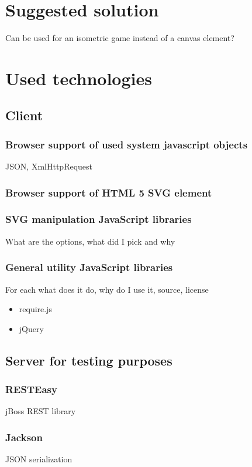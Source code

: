 \documentclass[11pt,oneside, final]{fithesis2}
\begin{document}
\chapter{Suggested solution}
Can be used for an isometric game instead of a canvas element?

\chapter{Used technologies}
\section{Client}

\subsection{Browser support of used system javascript objects}
JSON, XmlHttpRequest

\subsection{Browser support of HTML 5 SVG element}

\subsection{SVG manipulation JavaScript libraries}

What are the options, what did I pick and why

\subsection{General utility JavaScript libraries}
For each what does it do, why do I use it, source, license
\begin{itemize}
	\item require.js
	\item jQuery
\end{itemize}

\section{Server for testing purposes}
\subsection{RESTEasy}
jBoss REST library

\subsection{Jackson}
JSON serialization
\end{document}
